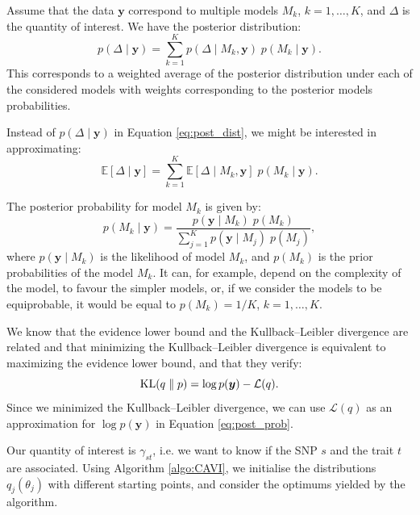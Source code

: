 \documentclass[a4paper, 11pt]{report}
\numberwithin{equation}{section}
\DeclareMathOperator*{\KL}{{\rm KL}}
\begin{document}
Assume that the data $\boldsymbol{y}$ correspond to multiple models $M_k$, $k= 1,\ldots,K$, and $\Delta$ is the quantity of interest. We have the posterior distribution:
\begin{equation}
p(\Delta \mid \boldsymbol{y}) = \sum_{k=1}^K p(\Delta \mid M_k,\boldsymbol{y}) \; p(M_k \mid \boldsymbol{y}).
\label{eq:post_dist}
\end{equation}
This corresponds to a weighted average of the posterior distribution under each of the considered models with weights corresponding to the posterior models probabilities.

Instead of $p(\Delta \mid \boldsymbol{y})$ in Equation \ref{eq:post_dist}, we might be interested in approximating:
\begin{equation*}
\mathbb{E}\left[\Delta \mid \boldsymbol{y}\right] = \sum_{k=1}^K\mathbb{E}\left[\Delta \mid M_k, \boldsymbol{y}\right]\;p(M_k \mid \boldsymbol{y}).
\end{equation*}

The posterior probability for model $M_k$ is given by:
\begin{equation}
p(M_k \mid \boldsymbol{y}) = \frac{p(\boldsymbol{y} \mid M_k)\; p(M_k)}{\sum_{j=1}^K p(\boldsymbol{y} \mid M_j)\; p(M_j)},
\label{eq:post_prob}
\end{equation}
where $p(\boldsymbol{y} \mid M_k)$ is the likelihood of model $M_k$, and $p(M_k)$ is the prior probabilities of the model $M_k$. It can, for example, depend on the complexity of the model, to favour the simpler models, or, if we consider the models to be equiprobable, it would be equal to $p(M_k) = 1/K$, $k = 1,\ldots,K$.  

We know that the evidence lower bound and the Kullback--Leibler divergence are related and that minimizing the Kullback--Leibler divergence is equivalent to maximizing the evidence lower bound, and that they verify: 
\begin{equation*}
\KL(q\parallel p) = \log p (\boldsymbol{y}) - \mathcal{L}(q).
\end{equation*}
Since we minimized the Kullback--Leibler divergence, we can use $\mathcal{L}(q)$ as an approximation for $\log p(\boldsymbol{y})$ in Equation \ref{eq:post_prob}.

Our quantity of interest is $\gamma_{st}$, i.e. we want to know if the SNP $s$ and the trait $t$ are associated. Using Algorithm \ref{algo:CAVI}, we initialise the distributions $q_j(\theta_j)$ with different starting points, and consider the optimums yielded by the algorithm.
\end{document}
